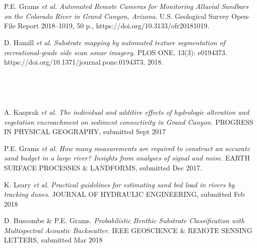 \documentclass{article} %
\def\sf{\sffamily}
\def\sl{\slshape}
\newlength\sidebarwidth
\newcommand{\subtopic}[3][]
	 {\begin{minipage}{\textwidth}
	 \vspace*{.4\baselineskip}
         \nopagebreak\hspace{0in}%
         \nopagebreak\begin{minipage}[t]{\sidebarwidth - .2cm}
         \raggedleft {\sf\fontseries{sbc}\selectfont #2}
         {\\[-0.2\baselineskip] \textcolor{gray}{\footnotesize #1}}
	 \end{minipage}%
	 \hfill
	 \begin{minipage}[t]{\linewidth - \sidebarwidth}
	 #3%
	 \end{minipage}%
	 \vspace*{.2\baselineskip plus 1\baselineskip minus
	 .2\baselineskip}%
	 \end{minipage}}
\begin{document}
\subtopic{\hspace*{-3ex} 2018}{~
  \begin{itemize}[leftmargin=0ex, itemsep=0ex, parsep=.5ex, labelindent=-4ex]
    \publication
      P.E. Grams {\sl et al.}
      {\sl Automated Remote Cameras for Monitoring Alluvial Sandbars on the Colorado River in Grand Canyon, Arizona}.
      U.S. Geological Survey Open-File Report 2018–1019, 50 p., https://doi.org/10.3133/ofr20181019.

    \publication
      D. Hamill {\sl et al.}
      {\sl Substrate mapping by automated texture segmentation of recreational-grade side scan sonar imagery.}
      PLOS ONE, 13(3): e0194373. https://doi.org/10.1371/journal.pone.0194373, 2018.

    \end{itemize}
}

\subtopic{\hspace*{-3ex} In Review}{~
  \begin{itemize}[leftmargin=0ex, itemsep=0ex, parsep=.5ex, labelindent=-4ex]

    \publication
      A. Kasprak {\sl et al.}
      {\sl The individual and additive effects of hydrologic alteration and vegetation encroachment on sediment connectivity in Grand Canyon.}
      PROGRESS IN PHYSICAL GEOGRAPHY, submitted Sept 2017

    \publication
      P.E. Grams {\sl et al.}
      {\sl How many measurements are required to construct an accurate sand budget in a large river? Insights from analyses of signal and noise.}
      EARTH SURFACE PROCESSES \& LANDFORMS, submitted Dec 2017.

    \publication
      K. Leary {\sl et al.}
      {\sl Practical guidelines for estimating sand bed load in rivers by tracking dunes}.
      JOURNAL OF HYDRAULIC ENGINEERING, submitted Feb 2018

    \publication
      D. Buscombe \& P.E. Grams.
      {\sl Probabilistic Benthic Substrate Classification with Multispectral Acoustic Backscatter.}
      IEEE GEOSCIENCE \& REMOTE SENSING LETTERS, submitted Mar 2018

    \end{itemize}
}
\end{document}
